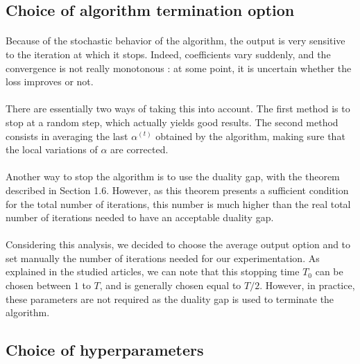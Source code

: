 \documentclass{article}
\begin{document}
\subsection{Choice of algorithm termination option}

\paragraph{}Because of the stochastic behavior of the algorithm, the output is very sensitive to the iteration at which it stops.
Indeed, coefficients vary suddenly, and the convergence is not really monotonous : at some point, it is uncertain whether the loss improves or not.

\paragraph{}There are essentially two ways of taking this into account.
The first method is to stop at a random step, which actually yields good results.
The second method consists in averaging the last $\alpha^{(t)}$ obtained by the algorithm, making sure that the local variations of $\alpha$ are corrected.

\paragraph{}Another way to stop the algorithm is to use the duality gap, with the theorem described in Section 1.6. However, as this theorem presents a sufficient condition for the total number of iterations, this number is much higher than the real total number of iterations needed to have an acceptable duality gap.

\paragraph{}Considering this analysis, we decided to choose the average output option and to set manually the number of iterations needed for our experimentation. As explained in the studied articles, we can note that this stopping time $T_0$ can be chosen between $1$ to $T$, and is generally chosen equal to $T/2$. However, in practice, these parameters are not required as the duality gap is used to terminate the algorithm.

\subsection{Choice of hyperparameters}
\end{document}
